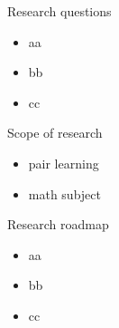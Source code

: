 \begin{frame}{Research questions}

\begin{itemize}
  \item aa
  \item bb
  \item cc
\end{itemize}

\end{frame}

\begin{frame}{Scope of research}
\begin{itemize}
    \item pair learning
    \item math subject
\end{itemize}
    
\end{frame}

\begin{frame}{Research roadmap}

\begin{itemize}
  \item aa
  \item bb
  \item cc
\end{itemize}

\end{frame}

